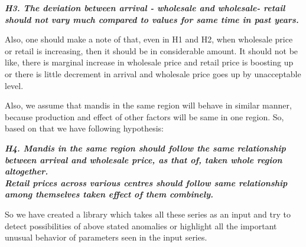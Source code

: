 \textbf{\textit{H3. The deviation between arrival - wholesale and wholesale- retail should not vary much compared to values for same time in past years.}}

Also, one should make a note of that, even in H1 and H2, when wholesale price or retail is increasing, then it should be in considerable amount. It should not be like, there is marginal increase in wholesale price and retail price is boosting up or there is little decrement in arrival and wholesale price goes up by unacceptable level.

Also, we assume that mandis in the same region will behave in similar manner, because production and effect of other factors will be same in one region. So, based on that we have following hypothesis:

\textbf{\textit{H4. Mandis in the same region should follow the same relationship between arrival and wholesale price, as that of, taken whole region altogether.}
 \\
\textit{Retail prices across various centres should follow same relationship among themselves taken effect of them combinely.} }

So we have created a library which takes all these series as an input and try to detect possibilities of above stated anomalies or highlight all the important unusual behavior of parameters seen in the input series.



